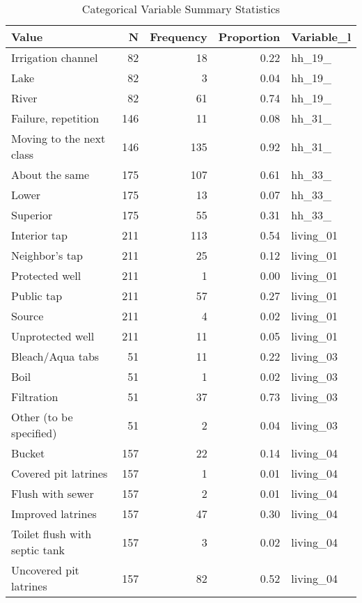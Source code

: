 \begin{table}[!t]
\caption*{
{\large Categorical Variable Summary Statistics}
} 
\fontsize{12.0pt}{14.4pt}\selectfont
\begin{tabular*}{\linewidth}{@{\extracolsep{\fill}}lrrrl}
\toprule
Value & N & Frequency & Proportion & Variable\_l \\ 
\midrule\addlinespace[2.5pt]
Irrigation channel & 82 & 18 & 0.22 & hh\_19\_ \\ 
Lake & 82 & 3 & 0.04 & hh\_19\_ \\ 
River & 82 & 61 & 0.74 & hh\_19\_ \\ 
Failure, repetition & 146 & 11 & 0.08 & hh\_31\_ \\ 
Moving to the next class & 146 & 135 & 0.92 & hh\_31\_ \\ 
About the same & 175 & 107 & 0.61 & hh\_33\_ \\ 
Lower & 175 & 13 & 0.07 & hh\_33\_ \\ 
Superior & 175 & 55 & 0.31 & hh\_33\_ \\ 
Interior tap & 211 & 113 & 0.54 & living\_01 \\ 
Neighbor’s tap & 211 & 25 & 0.12 & living\_01 \\ 
Protected well & 211 & 1 & 0.00 & living\_01 \\ 
Public tap & 211 & 57 & 0.27 & living\_01 \\ 
Source & 211 & 4 & 0.02 & living\_01 \\ 
Unprotected well & 211 & 11 & 0.05 & living\_01 \\ 
Bleach/Aqua tabs & 51 & 11 & 0.22 & living\_03 \\ 
Boil & 51 & 1 & 0.02 & living\_03 \\ 
Filtration & 51 & 37 & 0.73 & living\_03 \\ 
Other (to be specified) & 51 & 2 & 0.04 & living\_03 \\ 
Bucket & 157 & 22 & 0.14 & living\_04 \\ 
Covered pit latrines & 157 & 1 & 0.01 & living\_04 \\ 
Flush with sewer & 157 & 2 & 0.01 & living\_04 \\ 
Improved latrines & 157 & 47 & 0.30 & living\_04 \\ 
Toilet flush with septic tank & 157 & 3 & 0.02 & living\_04 \\ 
Uncovered pit latrines & 157 & 82 & 0.52 & living\_04 \\ 
\bottomrule
\end{tabular*}
\end{table}

